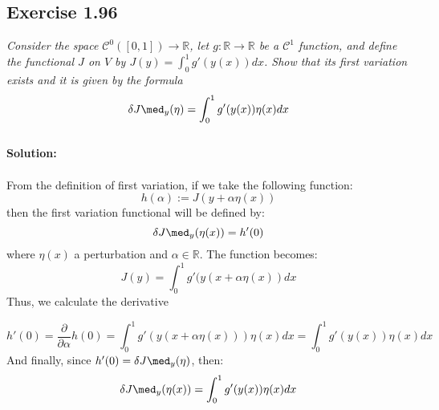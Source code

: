 \subsection{Exercise 1.96}
\emph{Consider the space $\mathcal{C}^0([0,1]) \to \mathbb{R}$, let $g : \mathbb{R} \to \mathbb{R}$ be a $\mathcal{C}^1$ function, and define the functional $J$ on $V$ by $J(y) = \int_0^1 g'(y(x))dx$. Show that its first variation exists and it is given by the formula}
\begin{equation}
    \delta J\med_y (\eta) = \int_0^1 g'(y(x)) \eta (x) dx
\end{equation}
\\
\textbf{Solution:}\\
\\
From the definition of first variation, if we take the following function:
\begin{equation}
    h(\alpha) := J(y + \alpha \eta(x))
\end{equation}
then the first variation functional will be defined by:
\begin{equation}
    \delta J\med_y (\eta(x)) = h'(0)
\end{equation}
where $\eta(x)$ a perturbation and $\alpha \in \mathbb{R}$. The function becomes:
\begin{equation}
    J(y) = \int_0^1 g'(y(x +\alpha \eta (x)) dx
\end{equation}
Thus, we calculate the derivative

\begin{equation}
    h'(0) = \frac{\partial}{\partial\alpha}h(0) = \int_0^1 g'(y(x + \alpha\eta(x)))\eta(x) dx =     \int_0^1 g'(y(x))\eta(x)dx
\end{equation}
And finally, since $h'(0) = \delta J\med_y (\eta)$, then:
\begin{equation}
    \delta J\med_y (\eta(x)) = \int_0^1 g'(y(x))\eta(x)dx    
\end{equation} 
\QEDB
